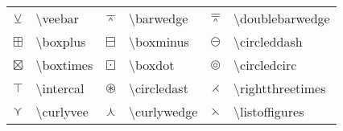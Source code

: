 \documentclass[a4paper]{ctexart}
\begin{document}
\begin{table}[H]
\begin{tabular}{clclcl}
            $\veebar$           & \textbackslash veebar         & $\barwedge$       & \textbackslash barwedge           &
            $\doublebarwedge$   & \textbackslash doublebarwedge                                                         \\
            $\boxplus$          & \textbackslash boxplus        & $\boxminus$       & \textbackslash boxminus           &
            $\circleddash$      & \textbackslash circleddash                                                            \\
            $\boxtimes$         & \textbackslash boxtimes       & $\boxdot$         & \textbackslash boxdot             &
            $\circledcirc$      & \textbackslash circledcirc                                                            \\
            $\intercal$         & \textbackslash intercal       & $\circledast$     & \textbackslash circledast         &
            $\rightthreetimes$  & \textbackslash rightthreetimes                                                        \\
            $\curlyvee$         & \textbackslash curlyvee       & $\curlywedge$     & \textbackslash curlywedge         &
            $\leftthreetimes$   & \textbackslash listoffigures                                                          \\
            \bottomrule
        \end{tabular}
    \end{table}
\end{document}
